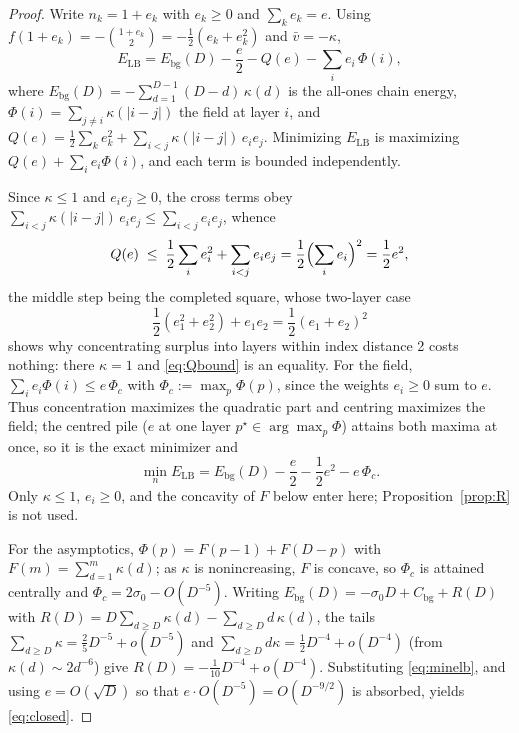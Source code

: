 \documentclass[11pt]{article}
\theoremstyle{remark}
\newcommand{\LB}{\mathrm{LB}}
\newcommand{\bg}{\mathrm{bg}}
\begin{document}
\begin{proof}
Write $n_k=1+e_k$ with $e_k\ge0$ and $\sum_k e_k=e$. Using $f(1+e_k)=-\binom{1+e_k}2=-\tfrac12(e_k+e_k^2)$ and $\bar v=-\kappa$,
\begin{equation}\label{eq:elbsplit}
E_\LB = E_\bg(D) - \frac e2 - Q(e) - \sum_i e_i\,\Phi(i),
\end{equation}
where $E_\bg(D)=-\sum_{d=1}^{D-1}(D-d)\,\kappa(d)$ is the all-ones chain energy, $\Phi(i)=\sum_{j\ne i}\kappa(|i-j|)$ the field at layer $i$, and $Q(e)=\tfrac12\sum_k e_k^2+\sum_{i<j}\kappa(|i-j|)\,e_i e_j$. Minimizing $E_\LB$ is maximizing $Q(e)+\sum_i e_i\Phi(i)$, and each term is bounded independently.

Since $\kappa\le1$ and $e_i e_j\ge0$, the cross terms obey $\sum_{i<j}\kappa(|i-j|)\,e_i e_j\le\sum_{i<j}e_i e_j$, whence
\begin{equation}\label{eq:Qbound}
Q(e) \;\le\; \frac12\sum_i e_i^2 + \sum_{i<j} e_i e_j = \frac12\Bigl(\sum_i e_i\Bigr)^2 = \frac12 e^2,
\end{equation}
the middle step being the completed square, whose two-layer case
\begin{equation}\label{eq:square}
\frac12(e_1^2+e_2^2)+e_1 e_2 = \frac12(e_1+e_2)^2
\end{equation}
shows why concentrating surplus into layers within index distance 2 costs nothing: there $\kappa=1$ and \eqref{eq:Qbound} is an equality. For the field, $\sum_i e_i\Phi(i)\le e\,\Phi_c$ with $\Phi_c:=\max_p\Phi(p)$, since the weights $e_i\ge0$ sum to $e$. Thus concentration maximizes the quadratic part and centring maximizes the field; the centred pile ($e$ at one layer $p^\star\in\arg\max_p\Phi$) attains both maxima at once, so it is the exact minimizer and
\begin{equation}\label{eq:minelb}
\min_n E_\LB = E_\bg(D) - \frac e2 - \frac12 e^2 - e\,\Phi_c.
\end{equation}
Only $\kappa\le1$, $e_i\ge0$, and the concavity of $F$ below enter here; Proposition~\ref{prop:R} is not used.

For the asymptotics, $\Phi(p)=F(p-1)+F(D-p)$ with $F(m)=\sum_{d=1}^m\kappa(d)$; as $\kappa$ is nonincreasing, $F$ is concave, so $\Phi_c$ is attained centrally and $\Phi_c=2\sigma_0-O(D^{-5})$. Writing $E_\bg(D)=-\sigma_0 D+C_\bg+R(D)$ with $R(D)=D\sum_{d\ge D}\kappa(d)-\sum_{d\ge D} d\,\kappa(d)$, the tails $\sum_{d\ge D}\kappa=\tfrac25 D^{-5}+o(D^{-5})$ and $\sum_{d\ge D} d\kappa=\tfrac12 D^{-4}+o(D^{-4})$ (from $\kappa(d)\sim 2d^{-6}$) give $R(D)=-\tfrac1{10}D^{-4}+o(D^{-4})$. Substituting \eqref{eq:minelb}, and using $e=O(\sqrt D)$ so that $e\cdot O(D^{-5})=O(D^{-9/2})$ is absorbed, yields \eqref{eq:closed}.
\end{proof}
\end{document}
